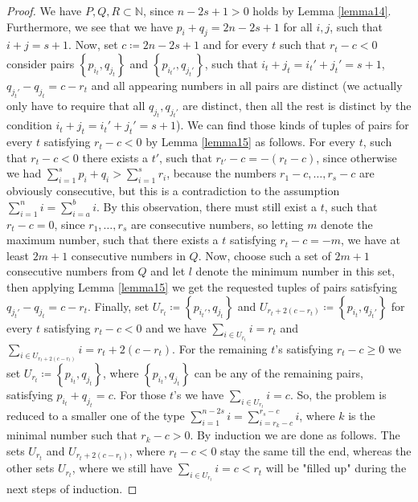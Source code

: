 \begin{thm}
\begin{proof}
We have \(P,Q,R\subset\mathbb{N}\), since \(n-2s+1>0\) holds by Lemma \ref{lemma14}. Furthermore, we see that we have \(p_i+q_j=2n-2s+1\) for all \(i,j\), such that \(i+j=s+1\). Now, set \(c\coloneqq 2n-2s+1\) and for every \(t\) such that \(r_t-c<0\) consider pairs \(\left\{p_{i_t},q_{j_t}\right\}\) and \(\left\{p_{i_t'},q_{j_t'}\right\}\), such that \(i_t+j_t=i_t'+j_t'=s+1\), \(q_{j_t'}-q_{j_t}=c-r_t\) and all appearing numbers in all pairs are distinct (we actually only have to require that all \(q_{j_t},q_{j_t'}\) are distinct, then all the rest is distinct by the condition \(i_t+j_t=i_t'+j_t'=s+1\)). We can find those kinds of tuples of pairs for every \(t\) satisfying \(r_t-c<0\) by Lemma \ref{lemma15} as follows. For every \(t\), such that \(r_t-c<0\) there exists a \(t'\), such that \(r_{t'}-c=-(r_t-c)\), since otherwise we had \(\sum\limits_{i=1}^sp_i+q_i>\sum\limits_{i=1}^sr_i\), because the numbers \(r_1-c,\ldots,r_s-c\) are obviously consecutive, but this is a contradiction to the assumption \(\sum\limits_{i=1}^ni=\sum\limits_{i=a}^bi\). By this observation, there must still exist a \(t\), such that \(r_t-c=0\), since \(r_1,\ldots,r_s\) are consecutive numbers, so letting \(m\) denote the maximum number, such that there exists a \(t\) satisfying \(r_t-c=-m\), we have at least \(2m+1\) consecutive numbers in \(Q\). Now, choose such a set of \(2m+1\) consecutive numbers from \(Q\) and let \(l\) denote the minimum number in this set, then applying Lemma \ref{lemma15} we get the requested tuples of pairs satisfying \(q_{j_t'}-q_{j_t}=c-r_t\). Finally, set \(U_{r_t}\coloneqq \left\{p_{i_t'},q_{j_t}\right\}\) and \(U_{r_t+2(c-r_t)}\coloneqq \left\{p_{i_t},q_{j_t'}\right\}\) for every \(t\) satisfying \(r_t-c<0\) and we have \(\sum\limits_{i\in U_{r_t}}i=r_t\) and \(\sum\limits_{i\in U_{r_t+2(c-r_t)}}i=r_t+2(c-r_t)\). For the remaining \(t\)'s satisfying \(r_t-c\geq 0\) we set \(U_{r_t}\coloneqq \left\{p_{i_t},q_{j_t}\right\}\), where \(\left\{p_{i_t},q_{j_t}\right\}\) can be any of the remaining pairs, satisfying \(p_{i_t}+q_{j_t}=c\). For those \(t\)'s we have \(\sum\limits_{i\in U_{r_t}}i=c\). So, the problem is reduced to a smaller one of the type \(\sum\limits_{i=1}^{n-2s}i=\sum\limits_{i=r_k-c}^{r_s-c}i\), where \(k\) is the minimal number such that \(r_k-c>0\). By induction we are done as follows. The sets \(U_{r_t}\) and \(U_{r_t+2(c-r_t)}\), where \(r_t-c<0\) stay the same till the end, whereas the other sets \(U_{r_t}\), where we still have \(\sum\limits_{i\in U_{r_t}}i=c<r_t\) will be "filled up" during the next steps of induction.
\end{proof}
\end{thm}

